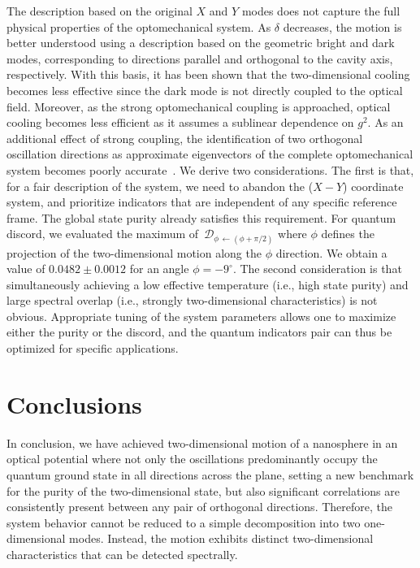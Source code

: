 \documentclass[11pt,floatfix,amssymb,prx,aps,longbibliography,superscriptaddress,nopacs]{revtex4-2}
\newcommand{\splitt}{\delta}
\begin{document}
The description based on the original $X$ and $Y$ modes does not capture the full physical properties of the optomechanical system. As $\splitt$ decreases, the motion is better understood using a description based on the geometric bright and dark modes, corresponding to directions parallel and orthogonal to the cavity axis, respectively. With this basis, it has been shown that the two-dimensional cooling becomes less effective since the dark mode is not directly coupled to the optical field. Moreover, as the strong optomechanical coupling is approached, optical cooling becomes less efficient as it assumes a sublinear dependence on $g^2$. As an additional effect of strong coupling, the identification of two orthogonal oscillation directions as approximate eigenvectors of the complete optomechanical system becomes poorly accurate~\cite{Ranfagni2021}. We derive two considerations. 
The first is that, for a fair description of the system, we need to abandon the ($X-Y$) coordinate system, and prioritize indicators that are independent of any specific reference frame. The global state purity already satisfies this requirement. For quantum discord, we evaluated the maximum of $\,\mathcal{D}_{\phi \,\leftarrow (\phi+\pi/2)} $ where $\phi$ defines the projection of the two-dimensional motion along the $\phi$ direction. We obtain a value of $0.0482\pm0.0012$ for an angle $\phi = -9^{\circ}$.
The second consideration is that simultaneously achieving a low effective temperature (i.e., high state purity) and large spectral overlap (i.e., strongly two-dimensional characteristics) is not obvious. Appropriate tuning of the system parameters allows one to maximize either the purity or the discord, and the quantum indicators pair can thus be optimized for specific applications. 



\section*{Conclusions}
 
In conclusion, we have achieved two-dimensional motion of a nanosphere in an optical potential where not only the oscillations predominantly occupy the quantum ground state in all directions across the plane, setting a new benchmark for the purity of the two-dimensional state, but also significant correlations are consistently present between any pair of orthogonal directions.
Therefore, the system behavior cannot be reduced to a simple decomposition into two one-dimensional modes. Instead, the motion exhibits distinct two-dimensional characteristics that can be detected spectrally.
\end{document}
